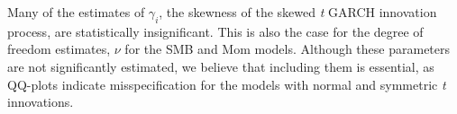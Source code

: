 

Many of the estimates of $\gamma_i$, the skewness of the skewed \emph{t} GARCH innovation process, are statistically insignificant. This is also the case for the degree of freedom estimates, $\nu$ for the SMB and Mom models. Although these parameters are not significantly estimated, we believe that including them is essential, as QQ-plots indicate misspecification for the models with normal and symmetric \emph{t} innovations.

